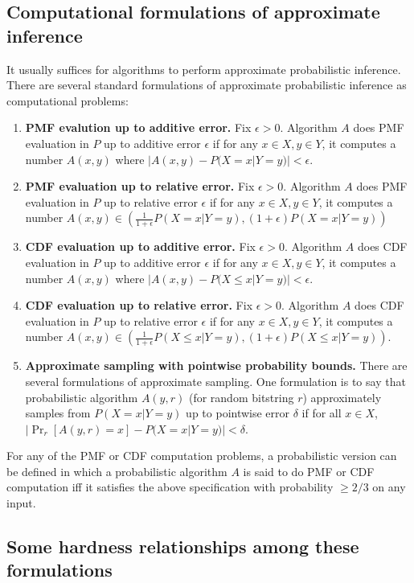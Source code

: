 \documentclass{article}
\theoremstyle{definition}
\theoremstyle{remark}
\begin{document}
\subsection{Computational formulations of approximate inference}
It usually suffices for algorithms to perform approximate probabilistic inference.
There are several standard formulations of approximate probabilistic inference as computational problems:
\begin{enumerate}
    \item \textbf{PMF evalution up to additive error.} Fix $\epsilon > 0$.  Algorithm $A$ does PMF evaluation in $P$ up to additive error $\epsilon$ if for any $x \in X, y \in Y$, it computes a number $A(x, y)$ where $|A(x, y) - P(X = x | Y = y)| < \epsilon$.
    \item \textbf{PMF evaluation up to relative error.} Fix $\epsilon > 0$.  Algorithm $A$ does PMF evaluation in $P$ up to relative error $\epsilon$ if for any $x \in X, y \in Y$, it computes a number $A(x, y) \in (\frac{1}{1 + \epsilon}P(X = x | Y = y), (1 + \epsilon)P(X = x | Y = y))$
    \item \textbf{CDF evaluation up to additive error.} Fix $\epsilon > 0$.  Algorithm $A$ does CDF evaluation in $P$ up to additive error $\epsilon$ if for any $x \in X, y \in Y$, it computes a number $A(x, y)$ where $|A(x, y) - P(X \leq x | Y = y)| < \epsilon$.
    \item \textbf{CDF evaluation up to relative error.} Fix $\epsilon > 0$.  Algorithm $A$ does CDF evaluation in $P$ up to relative error $\epsilon$ if for any $x \in X, y \in Y$, it computes a number $A(x, y) \in (\frac{1}{1 + \epsilon}P(X \leq x | Y = y), (1 + \epsilon)P(X \leq x | Y = y))$.
    \item \textbf{Approximate sampling with pointwise probability bounds.} There are several formulations of approximate sampling. One formulation is to say that probabilistic algorithm $A(y, r)$ (for random bitstring $r$) approximately samples from $P(X = x | Y = y)$ up to pointwise error $\delta$ if for all $x \in X$, $|\Pr_r[A(y, r) = x] - P(X = x | Y = y)| < \delta$.
\end{enumerate}
For any of the PMF or CDF computation problems, a probabilistic version can be defined in which a probabilistic algorithm $A$ is said to do PMF or CDF computation iff it satisfies the above specification with probability $\geq 2/3$ on any input.

\subsection{Some hardness relationships among these formulations} \label{sec:hardness_relationships}
\end{document}
